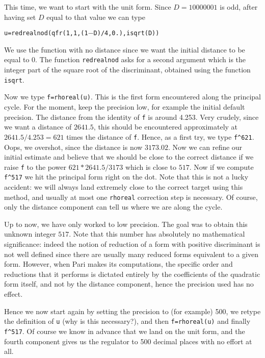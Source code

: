 This time, we want to start with the unit form. Since $D=10000001$ is odd,
after having set $D$ equal to that value we can type

\centerline{\tt u=redrealnod(qfr(1,1,(1$-$D)/4,0.),isqrt(D))}

We use the function with no distance since we want the initial distance to be
equal to 0. The function {\tt redrealnod} asks for a second argument which is
the integer part of the square root of the discriminant, obtained using the 
function {\tt isqrt}.

Now we type  {\tt f=rhoreal(u)}. This is the first form encountered along the
principal cycle. For the moment, keep the precision low, for example the
initial default precision. The distance from the identity of {\tt f} is
around 4.253. Very crudely, since we want a distance of $2641.5$, this should
be encountered approximately at $2641.5/4.253=621$ times the distance of 
{\tt f}. Hence, as a first try, we type {\tt f\^{}621}. Oops, we overshot,
since the distance is now $3173.02$. Now we can refine our initial estimate
and believe that we should be close to the correct distance if we raise {\tt f}
to the power $621*2641.5/3173$ which is close to $517$. Now if we compute
{\tt f\^{}517} we hit the principal form right on the dot. Note that this is
not a lucky accident: we will always land extremely close to the correct target
using this method, and usually at most one {\tt rhoreal} correction step is
necessary. Of course, only the distance component can tell us where we are
along the cycle.

Up to now, we have only worked to low precision. The goal was to obtain this
unknown integer $517$. Note that this number has absolutely no mathematical
significance: indeed the notion of reduction of a form with positive 
discriminant is not well defined since there are usually many reduced forms
equivalent to a given form. However, when Pari makes its computations, the
specific order and reductions that it performs is dictated entirely by the
coefficients of the quadratic form itself, and not by the distance component,
hence the precision used has no effect.

Hence we now start again by setting the precision to (for example) 500,
we retype the definition of {\tt u} (why is this necessary?), and then
{\tt f=rhoreal(u)} and finally {\tt f\^{}517}. Of course we know in advance
that we land on the unit form, and the fourth component gives us the regulator
to 500 decimal places with no effort at all.

